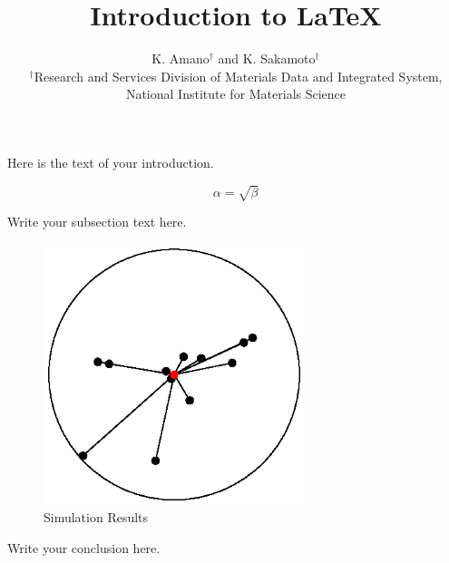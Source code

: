 \documentclass[a4paper]{article}
\begin{document}
\title{Introduction to \LaTeX{}}
\author{K. Amano$^{\dag}$ and K. Sakamoto$^{\dag}$\\$^{\dag}$Research and Services Division of Materials Data and Integrated System,\\National Institute for Materials Science}
\date{}

\maketitle


Here is the text of your introduction.

\begin{equation}
    \label{simple_equation}
    \alpha = \sqrt{ \beta }
\end{equation}

Write your subsection text here.

\begin{figure}
    \centering
    \includegraphics[width=3.0in]{fig-compactness.eps}
    \caption{Simulation Results}
    \label{simulationfigure}
\end{figure}

Write your conclusion here.
\end{document}
